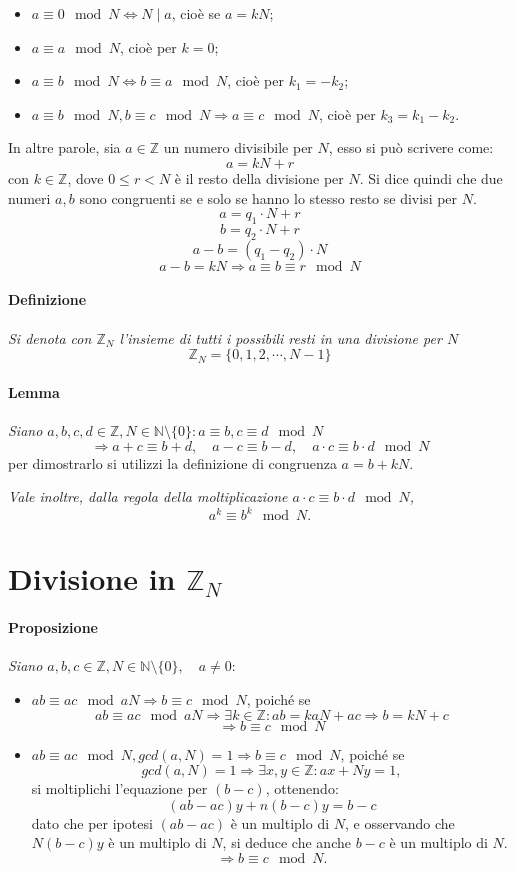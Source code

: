 \documentclass[a4paper]{report}
\begin{document}
\begin{itemize}
\item $a\equiv 0 \mod{N} \Leftrightarrow N\mid a$, cioè se $a=kN$;
\item $a\equiv a\mod{N}$, cioè per $k=0$;
\item $a\equiv b\mod{N} \Leftrightarrow b\equiv a\mod{N}$, cioè per $k_1=-k_2$;
\item $a\equiv b\mod {N}, b\equiv c\mod{N} \Rightarrow a\equiv c\mod {N}$, cioè per $k_3=k_1-k_2$.
\end{itemize}

In altre parole, sia $a\in \mathbb{Z}$ un numero divisibile per $N$, esso si può scrivere come:
$$a=kN+r$$
con $k\in \mathbb{Z}$, dove $0\leq r < N$ è il resto della divisione per $N$. Si dice quindi che due numeri $a,b$ sono congruenti se e solo se hanno lo stesso resto se divisi per $N$.
$$a=q_1\cdot N + r$$
$$b=q_2\cdot N + r$$
$$a-b=(q_1-q_2)\cdot N$$
$$a-b=kN\Rightarrow a\equiv b\equiv r \mod{N}$$
\paragraph{Definizione} \textit{Si denota con $\mathbb{Z}_N$ l'insieme di tutti i possibili resti in una divisione per $N$}
$$\mathbb{Z}_N=\{0,1,2,\cdots,N-1\}$$
\paragraph{Lemma} \textit{Siano $a,b,c,d\in \mathbb{Z}, N\in \mathbb{N}\setminus \{ 0\} : a\equiv b, c\equiv d \mod{N}$}
$$\Rightarrow a+c\equiv b+d,\quad a-c\equiv b-d,\quad a\cdot c\equiv b\cdot d \mod{N}$$
per dimostrarlo si utilizzi la definizione di congruenza $a=b+kN$.

\textit{Vale inoltre, dalla regola della moltiplicazione $a\cdot c\equiv b\cdot d \mod{N}$,}
$$a^k\equiv b^k \mod{N}.$$
\section{Divisione in $\mathbb{Z}_N$}
\paragraph{Proposizione} 
\textit{Siano $a,b,c\in \mathbb{Z}, N\in \mathbb{N}\setminus \{ 0\},\quad a\neq 0 $}:
\begin{itemize}
\item $ab\equiv ac \mod{aN} \Rightarrow b\equiv c\mod{N}$, poiché se
$$ab\equiv ac \mod{aN} \Rightarrow \exists k\in \mathbb{Z}: ab=kaN+ac\Rightarrow b=kN+c$$
$$\Rightarrow b\equiv c \mod{N}$$
\item $ab\equiv ac \mod{N}, gcd(a,N)=1 \Rightarrow b\equiv c\mod{N}$, poiché se
$$gcd(a,N)=1 \Rightarrow \exists x,y\in \mathbb{Z}: ax+Ny=1,$$
si moltiplichi l'equazione per $(b-c)$, ottenendo:
$$(ab-ac)y+n(b-c)y=b-c$$
dato che per ipotesi $(ab-ac)$ è un multiplo di $N$, e osservando che $N(b-c)y$ è un multiplo di $N$, si deduce che anche $b-c$ è un multiplo di $N$.
$$\Rightarrow b\equiv c \mod{N}.$$
\end{itemize}
\end{document}
